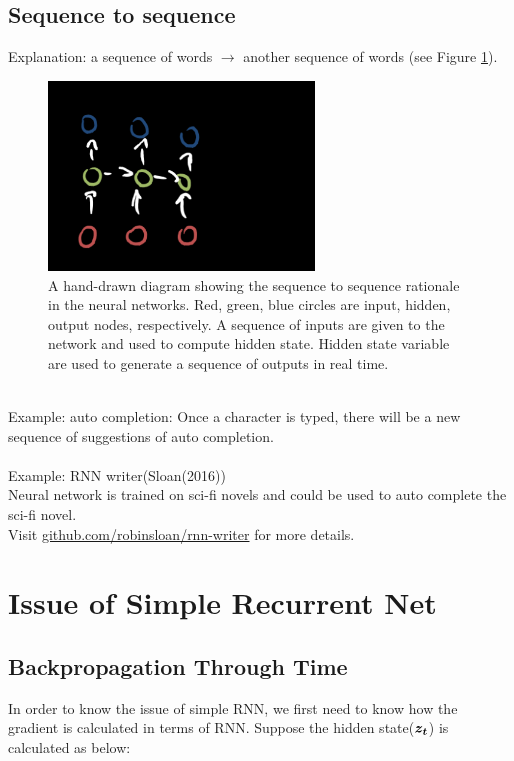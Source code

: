 \subsection{Sequence to sequence}
Explanation: a sequence of words $\rightarrow$ another sequence of words (see Figure \ref{fig:seq_to_seq}).\\
\begin{figure}[ht]
    \centering
    \includegraphics[width=200pt]{figs/seq_to_seq.png}
    \caption{A hand-drawn diagram showing the sequence to sequence rationale in the neural networks. Red, green, blue circles are input, hidden, output nodes, respectively. A sequence of inputs are given to the network and used to compute hidden state. Hidden state variable are used to generate a sequence of outputs in real time.}
    \label{fig:seq_to_seq}
\end{figure}
\\
Example: auto completion: Once a character is typed, there will be a new sequence of suggestions of auto completion. \\
\\
Example: RNN writer(Sloan(2016))\\
Neural network is trained on sci-fi novels and could be used to auto complete the sci-fi novel.\\
Visit \href{github.com/robinsloan/rnn-writer}{github.com/robinsloan/rnn-writer} for more details.\\





\section{Issue of Simple Recurrent Net}
\subsection{Backpropagation Through Time}
In order to know the issue of simple RNN, we first need to know how the gradient is calculated in terms of RNN. Suppose the hidden state($\vect{z_t}$) is calculated as below:

